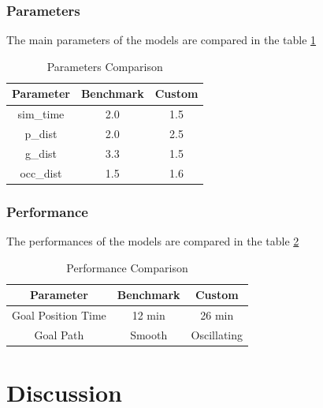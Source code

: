 \documentclass[10pt,journal,compsoc]{IEEEtran}
\begin{document}
\subsubsection{Parameters}
The main parameters of the models are compared in the table \ref{parametercomparetable}
\begin{table}[h]
\caption{Parameters Comparison}
\label{parametercomparetable}
\begin{center}
\begin{tabular}{|c||c|c|}
\hline
Parameter & Benchmark & Custom \\
\hline
 sim\_time & 2.0 & 1.5 \\
\hline
p\_dist & 2.0 & 2.5 \\
\hline
g\_dist & 3.3 &  1.5\\
\hline
occ\_dist & 1.5 & 1.6\\
\hline
\hline
\end{tabular}
\end{center}
\end{table}

\subsubsection{Performance}
The performances of the models are compared in the table \ref{performancecomparetable}
\begin{table}[h]
\caption{Performance Comparison}
\label{performancecomparetable}
\begin{center}
\begin{tabular}{|c||c|c|}
\hline
Parameter & Benchmark & Custom \\
\hline
Goal Position Time & 12 min & 26 min \\
\hline
Goal Path & Smooth & Oscillating \\
\hline
\end{tabular}
\end{center}
\end{table}

\section{Discussion}
\end{document}
